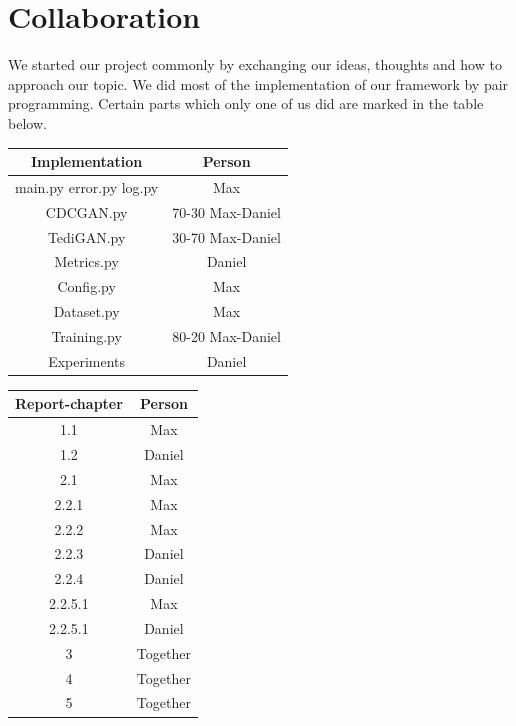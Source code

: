 \documentclass[12pt, a4paper]{article}
\begin{document}
\section{Collaboration}
We started our project commonly by exchanging our ideas, thoughts and how to approach our topic.
We did most of the implementation of our framework by pair programming. Certain parts which only one of us did are marked in the table below.
\begin{table}[h]
\centering
    \begin{tabular}{c|c}
        Implementation & Person \\        
        \hline
        main.py error.py log.py & Max\\
        CDCGAN.py & 70-30 Max-Daniel\\
        TediGAN.py & 30-70 Max-Daniel\\
        Metrics.py & Daniel\\
        Config.py & Max\\
        Dataset.py & Max\\
        Training.py & 80-20 Max-Daniel\\
        Experiments & Daniel\\
    \end{tabular} 
\end{table}
\begin{table}[h]
\centering
    \begin{tabular}{c|c}
        Report-chapter & Person \\        
        \hline
        1.1 & Max \\
        1.2 & Daniel \\
        2.1 & Max \\
        2.2.1 & Max \\
        2.2.2 & Max \\
        2.2.3 & Daniel \\
        2.2.4 & Daniel \\
        2.2.5.1 & Max \\
        2.2.5.1 & Daniel \\
        3 & Together \\
        4 & Together \\
        5 & Together \\
    \end{tabular}
\end{table}

\nocite{*}


\end{document}
